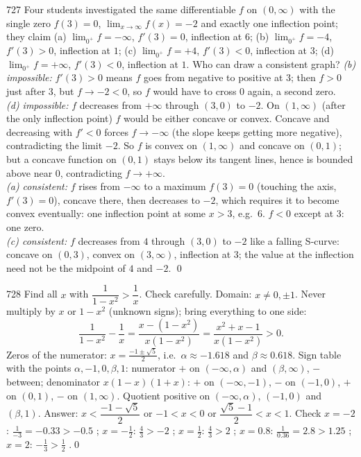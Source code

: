 \begin{bookex}{727}
Four students investigated the same differentiable $f$ on $(0,\infty)$ with the single zero $f(3)=0$, $\lim_{x\to\infty}f(x)=-2$ and exactly one inflection point; they claim (a) $\lim_{0^+}f=-\infty$, $f'(3)=0$, inflection at $6$; (b) $\lim_{0^+}f=-4$, $f'(3)>0$, inflection at $1$; (c) $\lim_{0^+}f=+4$, $f'(3)<0$, inflection at $3$; (d) $\lim_{0^+}f=+\infty$, $f'(3)<0$, inflection at $1$. Who can draw a consistent graph?
\solution
\emph{(b) impossible:} $f'(3)>0$ means $f$ goes from negative to positive at $3$; then $f>0$ just after $3$, but $f\to-2<0$, so $f$ would have to cross $0$ again, a second zero.\\
\emph{(d) impossible:} $f$ decreases from $+\infty$ through $(3,0)$ to $-2$. On $(1,\infty)$ (after the only inflection point) $f$ would be either concave or convex. Concave and decreasing with $f'<0$ forces $f\to-\infty$ (the slope keeps getting more negative), contradicting the limit $-2$. So $f$ is convex on $(1,\infty)$ and concave on $(0,1)$; but a concave function on $(0,1)$ stays below its tangent lines, hence is bounded above near $0$, contradicting $f\to+\infty$. \\
\emph{(a) consistent:} $f$ rises from $-\infty$ to a maximum $f(3)=0$ (touching the axis, $f'(3)=0$), concave there, then decreases to $-2$, which requires it to become convex eventually: one inflection point at some $x>3$, e.g.\ $6$. $f<0$ except at $3$: one zero. \checkmark\\
\emph{(c) consistent:} $f$ decreases from $4$ through $(3,0)$ to $-2$ like a falling S-curve: concave on $(0,3)$, convex on $(3,\infty)$, inflection at $3$; the value at the inflection need not be the midpoint of $4$ and $-2$. \checkmark\qed
\end{bookex}

\begin{bookex}{728}
Find all $x$ with $\dfrac1{1-x^2}>\dfrac1x$. Check carefully.
\solution
Domain: $x\ne0,\pm1$. Never multiply by $x$ or $1-x^2$ (unknown signs); bring everything to one side:
\[
\frac1{1-x^2}-\frac1x=\frac{x-(1-x^2)}{x(1-x^2)}=\frac{x^2+x-1}{x(1-x^2)}>0 .
\]
Zeros of the numerator: $x=\frac{-1\pm\sqrt5}2$, i.e.\ $\alpha\approx-1.618$ and $\beta\approx0.618$. Sign table with the points $\alpha,-1,0,\beta,1$: numerator $+$ on $(-\infty,\alpha)$ and $(\beta,\infty)$, $-$ between; denominator $x(1-x)(1+x)$: $+$ on $(-\infty,-1)$, $-$ on $(-1,0)$, $+$ on $(0,1)$, $-$ on $(1,\infty)$. Quotient positive on $(-\infty,\alpha)$, $(-1,0)$ and $(\beta,1)$. Answer: $x<\dfrac{-1-\sqrt5}2$ or $-1<x<0$ or $\dfrac{\sqrt5-1}2<x<1$. Check $x=-2$: $\frac1{-3}=-0.33>-0.5$ \checkmark; $x=-\frac12$: $\frac43>-2$ \checkmark; $x=\frac12$: $\frac43>2$ \texttimes; $x=0.8$: $\frac1{0.36}=2.8>1.25$ \checkmark; $x=2$: $-\frac13>\frac12$ \texttimes.\qed
\end{bookex}

